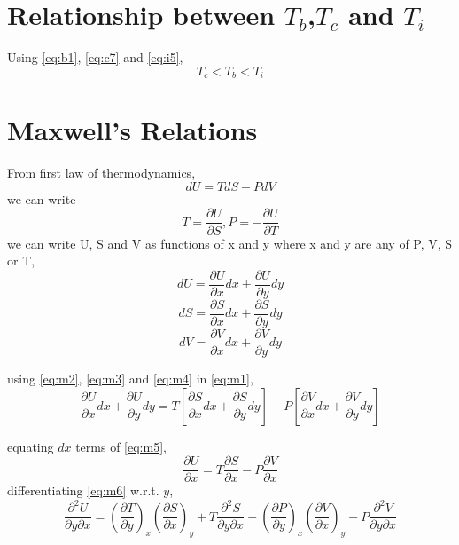 \documentclass{article}
\numberwithin{equation}{section}
\begin{document}
\section{Relationship between $T_b$,$T_c$ and $T_i$}
Using \eqref{eq:b1}, \eqref{eq:c7} and \eqref{eq:i5},
$$T_c < T_b < T_i$$

\section{Maxwell's Relations}
From first law of thermodynamics,
\begin{equation}
  dU = TdS - PdV \label{eq:m1}
\end{equation}
we can write
$$T = \frac{\partial U}{\partial S} , P = -\frac{\partial U}{\partial T} $$
we can write U, S and V as functions of x and y where x and y are any of P, V, S or T,
\begin{equation}
  dU = \frac{\partial U}{\partial x}dx + \frac{\partial U}{\partial y}dy \label{eq:m2}
\end{equation}
\begin{equation}
  dS = \frac{\partial S}{\partial x}dx + \frac{\partial S}{\partial y}dy \label{eq:m3}
\end{equation}
\begin{equation}
  dV = \frac{\partial V}{\partial x}dx + \frac{\partial V}{\partial y}dy \label{eq:m4}
\end{equation}

using \eqref{eq:m2}, \eqref{eq:m3} and \eqref{eq:m4} in \eqref{eq:m1},
\begin{equation}
\frac{\partial U}{\partial x}dx + \frac{\partial U}{\partial y}dy = T\left[\frac{\partial S}{\partial x}dx + \frac{\partial S}{\partial y}dy \right] - P\left[\frac{\partial V}{\partial x}dx + \frac{\partial V}{\partial y}dy\right] \label{eq:m5}
\end{equation}

equating $dx$ terms of \eqref{eq:m5},
\begin{equation}
  \frac{\partial U}{\partial x} = T\frac{\partial S}{\partial x} - P\frac{\partial V}{\partial x} \label{eq:m6}
\end{equation}
differentiating \eqref{eq:m6} w.r.t. $y$,
\begin{equation}
  \frac{\partial^2 U}{\partial y \partial x} = \left(\frac{\partial T}{\partial y}\right)_x \left(\frac{\partial S}{\partial x}\right)_y + T\frac{\partial^2 S}{\partial y \partial x} - \left(\frac{\partial P}{\partial y}\right)_x \left(\frac{\partial V}{\partial x}\right)_y - P\frac{\partial^2 V}{\partial y \partial x} \label{eq:m7}
\end{equation}
\end{document}
